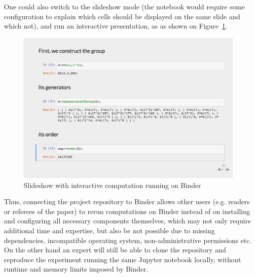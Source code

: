 One could also switch to the slideshow mode (the notebook would require
some configuration to explain which cells should be displayed on the
same slide and which not), and run an interactive presentation, as
as shown on Figure~\ref{fig:unipoly-slide}.

\begin{figure}[!ht]
    \centering
    \includegraphics[width=\textwidth]{images/unipoly-slide}
    \caption{Slideshow with interactive computation running on Binder}
    \label{fig:unipoly-slide}
\end{figure}

Thus, connecting the project repository to Binder allows other users
(e.g. readers or referees of the paper) to rerun computations on Binder
instead of on installing and configuring all necessary components 
themselves, which may not only require additional time and expertise,
but also be not possible due to missing dependencies, incompatible
operating system, non-administrative permissions etc. On the other 
hand an expert will still be able to clone the repository and 
reproduce the experiment running the same Jupyter notebook locally,
without runtime and memory limits imposed by Binder.
